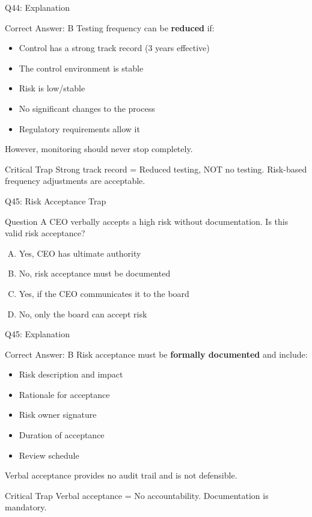 \documentclass{beamer}
\begin{document}
	\begin{frame}{Q44: Explanation}
		\begin{block}{Correct Answer: B}
			Testing frequency can be \textbf{reduced} if:
			\begin{itemize}
				\item Control has a strong track record (3 years effective)
				\item The control environment is stable
				\item Risk is low/stable
				\item No significant changes to the process
				\item Regulatory requirements allow it
			\end{itemize}
			However, monitoring should never stop completely.
		\end{block}
		\begin{alertblock}{Critical Trap}
			Strong track record = Reduced testing, NOT no testing.
			Risk-based frequency adjustments are acceptable.
		\end{alertblock}
	\end{frame}
	
	\begin{frame}{Q45: Risk Acceptance Trap}
		\begin{block}{Question}
			A CEO verbally accepts a high risk without documentation. Is this valid risk acceptance?
		\end{block}
		\begin{enumerate}[(A)]
			\item Yes, CEO has ultimate authority
			\item No, risk acceptance must be documented
			\item Yes, if the CEO communicates it to the board
			\item No, only the board can accept risk
		\end{enumerate}
	\end{frame}
	
	\begin{frame}{Q45: Explanation}
		\begin{block}{Correct Answer: B}
			Risk acceptance must be \textbf{formally documented} and include:
			\begin{itemize}
				\item Risk description and impact
				\item Rationale for acceptance
				\item Risk owner signature
				\item Duration of acceptance
				\item Review schedule
			\end{itemize}
			Verbal acceptance provides no audit trail and is not defensible.
		\end{block}
		\begin{alertblock}{Critical Trap}
			Verbal acceptance = No accountability.
			Documentation is mandatory.
		\end{alertblock}
	\end{frame}
	
\end{document}
